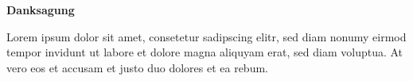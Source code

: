 \vspace*{\fill}
\begin{center}\textsf{\textbf{Danksagung}}\end{center}

\noindent Lorem ipsum dolor sit amet, consetetur sadipscing elitr, sed diam nonumy eirmod tempor invidunt ut labore et dolore magna aliquyam erat, sed diam voluptua. At vero eos et accusam et justo duo dolores et ea rebum.

\vspace*{\fill}